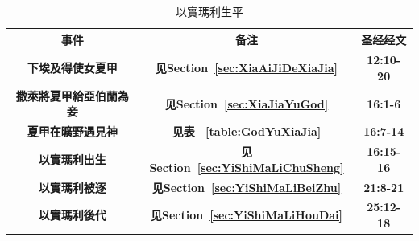 \begin{table}[H]
\begin{threeparttable}
\begin{tabular}{c c c}
\toprule
 \multicolumn{1}{L{\dimexpr0.5\linewidth-1\tabcolsep\relax}}{\bfseries 事件} 
&\multicolumn{1}{L{\dimexpr0.2\linewidth-1\tabcolsep\relax}}{\bfseries  备注}   
&\multicolumn{1}{L{\dimexpr0.1\linewidth-1\tabcolsep\relax}}{\bfseries 圣经经文} \\\hline

\multicolumn{1}{L{\dimexpr0.5\linewidth-1\tabcolsep\relax}}{\bfseries 下埃及得使女夏甲}  
& \multicolumn{1}{L{\dimexpr0.2\linewidth-1\tabcolsep\relax}}{\bfseries  见Section~\ref{sec:XiaAiJiDeXiaJia}}
& \multicolumn{1}{L{\dimexpr0.1\linewidth-1\tabcolsep\relax}}{\bfseries 12:10-20}\\ 

\multicolumn{1}{L{\dimexpr0.5\linewidth-1\tabcolsep\relax}}{\bfseries 撒萊將夏甲給亞伯蘭為妾}  
& \multicolumn{1}{L{\dimexpr0.2\linewidth-1\tabcolsep\relax}}{\bfseries  见Section~\ref{sec:XiaJiaYuGod}}
& \multicolumn{1}{L{\dimexpr0.1\linewidth-1\tabcolsep\relax}}{\bfseries 16:1-6}\\ 

\multicolumn{1}{L{\dimexpr0.5\linewidth-1\tabcolsep\relax}}{\bfseries 夏甲在曠野遇見神}  
& \multicolumn{1}{L{\dimexpr0.2\linewidth-1\tabcolsep\relax}}{\bfseries  见表~ \ref{table:GodYuXiaJia}}
& \multicolumn{1}{L{\dimexpr0.1\linewidth-1\tabcolsep\relax}}{\bfseries 16:7-14}\\ 

\multicolumn{1}{L{\dimexpr0.5\linewidth-1\tabcolsep\relax}}{\bfseries 以實瑪利出生}  
& \multicolumn{1}{L{\dimexpr0.2\linewidth-1\tabcolsep\relax}}{\bfseries  见Section~\ref{sec:YiShiMaLiChuSheng}}
& \multicolumn{1}{L{\dimexpr0.1\linewidth-1\tabcolsep\relax}}{\bfseries 16:15-16}\\ 

\multicolumn{1}{L{\dimexpr0.5\linewidth-1\tabcolsep\relax}}{\bfseries 以實瑪利被逐}  
& \multicolumn{1}{L{\dimexpr0.2\linewidth-1\tabcolsep\relax}}{\bfseries 见Section~\ref{sec:YiShiMaLiBeiZhu}}
& \multicolumn{1}{L{\dimexpr0.1\linewidth-1\tabcolsep\relax}}{\bfseries 21:8-21}\\ 
\multicolumn{1}{L{\dimexpr0.5\linewidth-1\tabcolsep\relax}}{\bfseries 以實瑪利後代}  
& \multicolumn{1}{L{\dimexpr0.2\linewidth-1\tabcolsep\relax}}{\bfseries 见Section~\ref{sec:YiShiMaLiHouDai}}
& \multicolumn{1}{L{\dimexpr0.1\linewidth-1\tabcolsep\relax}}{\bfseries 25:12-18}\\ \hline
\end{tabular}
\caption{以實瑪利生平}
\label{table:YiShiMaLiShengPing}
\end{threeparttable}
\end{table}



